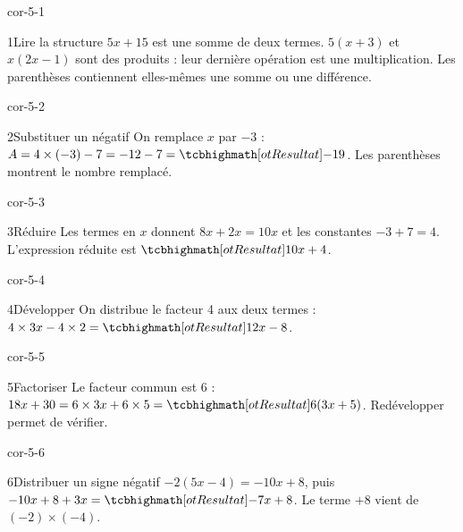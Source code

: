 \clearpage\pagestyle{otMain}\setlength{\otBlocEspacement}{2.5mm}\fontsize{11}{15}\selectfont{}
\begin{blocLivre}{cor-5-1}\begin{corrige}{1}{Lire la structure}
$5x+15$ est une somme de deux termes. $5(x+3)$ et $x(2x-1)$ sont des produits : leur dernière opération est une multiplication. Les parenthèses contiennent elles-mêmes une somme ou une différence.
\end{corrige}\end{blocLivre}
\begin{blocLivre}{cor-5-2}\begin{corrige}{2}{Substituer un négatif}
On remplace $x$ par $-3$ : $A=4\times(-3)-7=-12-7=\res{-19}$. Les parenthèses montrent le nombre remplacé.
\end{corrige}\end{blocLivre}
\begin{blocLivre}{cor-5-3}\begin{corrige}{3}{Réduire}
Les termes en $x$ donnent $8x+2x=10x$ et les constantes $-3+7=4$. L’expression réduite est $\res{10x+4}$.
\end{corrige}\end{blocLivre}
\begin{blocLivre}{cor-5-4}\begin{corrige}{4}{Développer}
On distribue le facteur 4 aux deux termes : $4\times3x-4\times2=\res{12x-8}$.
\end{corrige}\end{blocLivre}
\begin{blocLivre}{cor-5-5}\begin{corrige}{5}{Factoriser}
Le facteur commun est 6 : $18x+30=6\times3x+6\times5=\res{6(3x+5)}$. Redévelopper permet de vérifier.
\end{corrige}\end{blocLivre}
\begin{blocLivre}{cor-5-6}\begin{corrige}{6}{Distribuer un signe négatif}
$-2(5x-4)=-10x+8$, puis $-10x+8+3x=\res{-7x+8}$. Le terme $+8$ vient de $(-2)\times(-4)$.
\end{corrige}\end{blocLivre}
